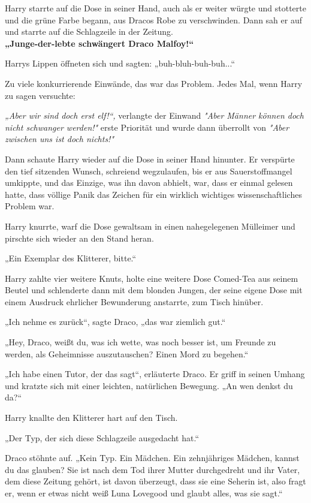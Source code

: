 {Harry starrte auf die Dose in seiner Hand, auch als er weiter würgte und stotterte und die grüne Farbe begann, aus Dracos Robe zu verschwinden. Dann sah er auf und starrte auf die Schlagzeile in der Zeitung.\\ \textbf{„Junge-der-lebte schwängert Draco Malfoy!“}

Harrys Lippen öffneten sich und sagten: „buh-bluh-buh-buh...“

Zu viele konkurrierende Einwände, das war das Problem. Jedes Mal, wenn Harry zu sagen versuchte:

\emph{„Aber wir sind doch erst elf!“,} verlangte der Einwand \emph{"Aber Männer können doch nicht schwanger werden!"} erste Priorität und wurde dann überrollt von \emph{"Aber zwischen uns ist doch nichts!"}

Dann schaute Harry wieder auf die Dose in seiner Hand hinunter. Er verspürte den tief sitzenden Wunsch, schreiend wegzulaufen, bis er aus Sauerstoffmangel umkippte, und das Einzige, was ihn davon abhielt, war, dass er einmal gelesen hatte, dass völlige Panik das Zeichen für ein wirklich wichtiges wissenschaftliches Problem war.

Harry knurrte, warf die Dose gewaltsam in einen nahegelegenen Mülleimer und pirschte sich wieder an den Stand heran.

„Ein Exemplar des Klitterer, bitte.“

Harry zahlte vier weitere Knuts, holte eine weitere Dose Comed-Tea aus seinem Beutel und schlenderte dann mit dem blonden Jungen, der seine eigene Dose mit einem Ausdruck ehrlicher Bewunderung anstarrte, zum Tisch hinüber.

„Ich nehme es zurück“, sagte Draco, „das war ziemlich gut.“

„Hey, Draco, weißt du, was ich wette, was noch besser ist, um Freunde zu werden, als Geheimnisse auszutauschen? Einen Mord zu begehen.“

„Ich habe einen Tutor, der das sagt“, erläuterte Draco. Er griff in seinen Umhang und kratzte sich mit einer leichten, natürlichen Bewegung. „An wen denkst du da?“

Harry knallte den Klitterer hart auf den Tisch.

„Der Typ, der sich diese Schlagzeile ausgedacht hat.“

Draco stöhnte auf. „Kein Typ. Ein Mädchen. Ein zehnjähriges Mädchen, kannst du das glauben? Sie ist nach dem Tod ihrer Mutter durchgedreht und ihr Vater, dem diese Zeitung gehört, ist davon überzeugt, dass sie eine Seherin ist, also fragt er, wenn er etwas nicht weiß Luna Lovegood und glaubt alles, was sie sagt.“

}
